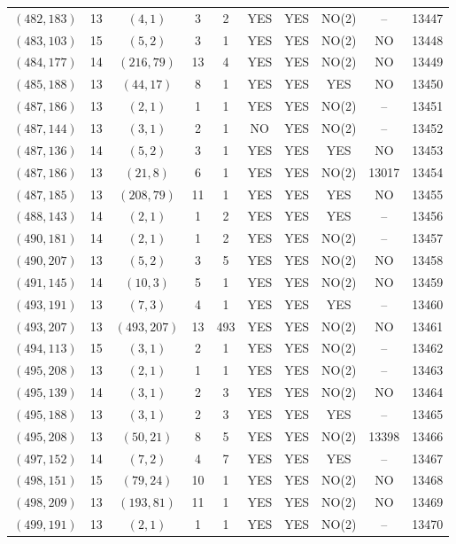 \begin{longtable}{|c|c|c|c|c|c|c|c|c|c|}
$(482, 183)$ & 13 & $(4, 1)$ & 3 & 2 & YES & YES & NO(2) & -- & 13447\\
$(483, 103)$ & 15 & $(5, 2)$ & 3 & 1 & YES & YES & NO(2) & NO & 13448\\
$(484, 177)$ & 14 & $(216, 79)$ & 13 & 4 & YES & YES & NO(2) & NO & 13449\\
$(485, 188)$ & 13 & $(44, 17)$ & 8 & 1 & YES & YES & YES & NO & 13450\\
$(487, 186)$ & 13 & $(2, 1)$ & 1 & 1 & YES & YES & NO(2) & -- & 13451\\
$(487, 144)$ & 13 & $(3, 1)$ & 2 & 1 & NO & YES & NO(2) & -- & 13452\\
$(487, 136)$ & 14 & $(5, 2)$ & 3 & 1 & YES & YES & YES & NO & 13453\\
$(487, 186)$ & 13 & $(21, 8)$ & 6 & 1 & YES & YES & NO(2) & 13017 & 13454\\
$(487, 185)$ & 13 & $(208, 79)$ & 11 & 1 & YES & YES & YES & NO & 13455\\
$(488, 143)$ & 14 & $(2, 1)$ & 1 & 2 & YES & YES & YES & -- & 13456\\
$(490, 181)$ & 14 & $(2, 1)$ & 1 & 2 & YES & YES & NO(2) & -- & 13457\\
$(490, 207)$ & 13 & $(5, 2)$ & 3 & 5 & YES & YES & NO(2) & NO & 13458\\
$(491, 145)$ & 14 & $(10, 3)$ & 5 & 1 & YES & YES & NO(2) & NO & 13459\\
$(493, 191)$ & 13 & $(7, 3)$ & 4 & 1 & YES & YES & YES & -- & 13460\\
$(493, 207)$ & 13 & $(493, 207)$ & 13 & 493 & YES & YES & NO(2) & NO & 13461\\
$(494, 113)$ & 15 & $(3, 1)$ & 2 & 1 & YES & YES & NO(2) & -- & 13462\\
$(495, 208)$ & 13 & $(2, 1)$ & 1 & 1 & YES & YES & NO(2) & -- & 13463\\
$(495, 139)$ & 14 & $(3, 1)$ & 2 & 3 & YES & YES & NO(2) & NO & 13464\\
$(495, 188)$ & 13 & $(3, 1)$ & 2 & 3 & YES & YES & YES & -- & 13465\\
$(495, 208)$ & 13 & $(50, 21)$ & 8 & 5 & YES & YES & NO(2) & 13398 & 13466\\
$(497, 152)$ & 14 & $(7, 2)$ & 4 & 7 & YES & YES & YES & -- & 13467\\
$(498, 151)$ & 15 & $(79, 24)$ & 10 & 1 & YES & YES & NO(2) & NO & 13468\\
$(498, 209)$ & 13 & $(193, 81)$ & 11 & 1 & YES & YES & NO(2) & NO & 13469\\
$(499, 191)$ & 13 & $(2, 1)$ & 1 & 1 & YES & YES & NO(2) & -- & 13470\\

\end{longtable}
